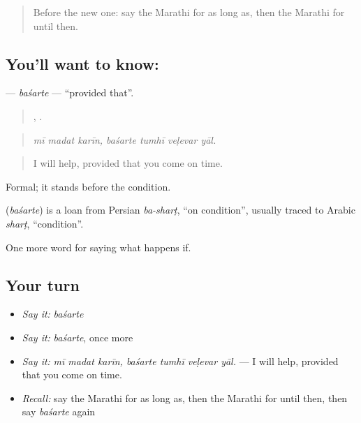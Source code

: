 \label{lesson:MR-C381-basarte}



\begin{quote}
Before the new one: say the Marathi for as long as, then the Marathi for until then.
\end{quote}

\subsection*{You'll want to know: }
\textbf{} — \emph{baśarte} — \textquotedblleft{}provided that\textquotedblright{}.

\begin{quote}
  ,    .
\end{quote}

\begin{quote}
\emph{mī madat karīn, baśarte tumhī veḷevar yāl.}
\end{quote}

\begin{quote}
I will help, provided that you come on time.
\end{quote}

Formal; it stands before the condition.

\begin{cousinweb}
\textbf{} (\emph{baśarte}) is a loan from Persian \emph{ba-sharṭ}, \textquotedblleft{}on condition\textquotedblright{}, usually traced to Arabic \emph{sharṭ}, \textquotedblleft{}condition\textquotedblright{}.
\end{cousinweb}

\begin{grammarlens}[title={What you've built}]
One more word for saying what happens if.
\end{grammarlens}

\subsection*{Your turn}
\begin{itemize}
\raggedright
  \item \emph{Say it:} \emph{baśarte}
  \item \emph{Say it:} \emph{baśarte}, once more
  \item \emph{Say it:} \emph{mī madat karīn, baśarte tumhī veḷevar yāl.} — I will help, provided that you come on time.
  \item \emph{Recall:} say the Marathi for as long as, then the Marathi for until then, then say \emph{baśarte} again
\end{itemize}


